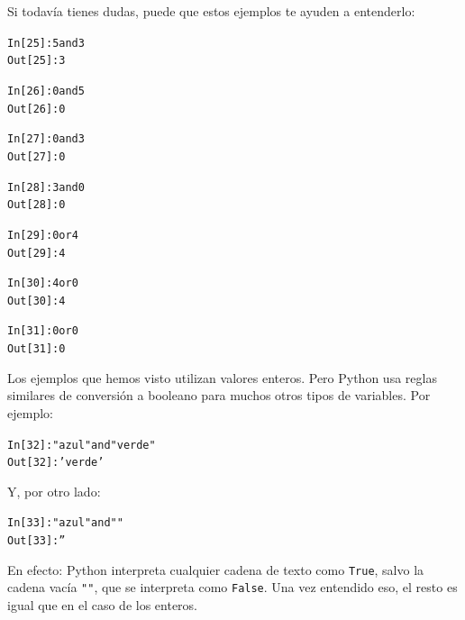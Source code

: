 \documentclass[10pt,a4paper]{article}\usepackage[]{graphicx}\usepackage[]{color}
\makeatletter
\newcommand{\hlstr}[1]{\textcolor[rgb]{0.192,0.494,0.8}{#1}}%
\newenvironment{kframe}{%
 \def\at@end@of@kframe{}%
 \ifinner\ifhmode%
  \def\at@end@of@kframe{\end{minipage}}%
  \begin{minipage}{\columnwidth}%
 \fi\fi%
 \def\FrameCommand##1{\hskip\@totalleftmargin \hskip-\fboxsep
 \colorbox{shadecolor}{##1}\hskip-\fboxsep
     \hskip-\linewidth \hskip-\@totalleftmargin \hskip\columnwidth}%
 \MakeFramed {\advance\hsize-\width
   \@totalleftmargin\z@ \linewidth\hsize
   \@setminipage}}%
 {\par\unskip\endMakeFramed%
 \at@end@of@kframe}
\newenvironment{knitrout}{}{} %
\makeatother
\begin{document}
Si todavía tienes dudas, puede que estos ejemplos te ayuden a entenderlo:
\begin{knitrout}
\color{fgcolor}\begin{kframe}
\begin{alltt}
In [25]: 5 and 3
Out[25]: 3

In [26]: 0 and 5
Out[26]: 0

In [27]: 0 and 3
Out[27]: 0

In [28]: 3 and 0
Out[28]: 0

In [29]: 0 or 4
Out[29]: 4

In [30]: 4 or 0
Out[30]: 4

In [31]: 0 or 0
Out[31]: 0
\end{alltt}
\end{kframe}
\end{knitrout}
Los ejemplos que hemos visto utilizan valores enteros. Pero Python usa reglas similares de conversión a booleano para muchos otros tipos de variables. Por ejemplo:
\begin{knitrout}
\color{fgcolor}\begin{kframe}
\begin{alltt}
In [32]: \hlstr{"azul"} and \hlstr{"verde"}
Out[32]: \hlstr{'verde'}
\end{alltt}
\end{kframe}
\end{knitrout}
Y, por otro lado:
\begin{knitrout}
\color{fgcolor}\begin{kframe}
\begin{alltt}
In [33]: \hlstr{"azul"} and \hlstr{""}
Out[33]: \hlstr{''}
\end{alltt}
\end{kframe}
\end{knitrout}
En efecto: Python interpreta cualquier cadena de texto como {\tt True}, salvo la {\sf cadena vacía} \verb&""&, que se interpreta como {\tt False}. Una vez entendido eso, el resto es igual que en el caso de los enteros.
\end{document}
